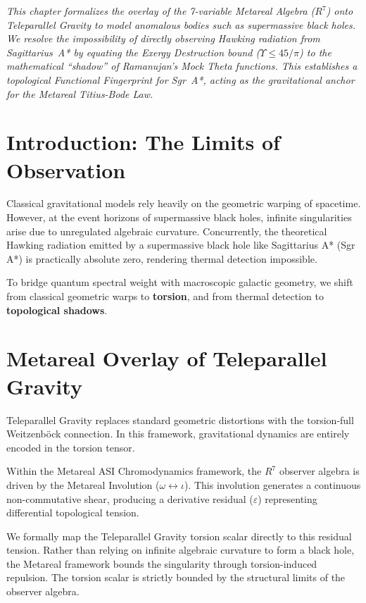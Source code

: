 \noindent\textit{This chapter formalizes the overlay of the 7-variable Metareal Algebra ($R^7$) onto Teleparallel Gravity to model anomalous bodies such as supermassive black holes. We resolve the impossibility of directly observing Hawking radiation from Sagittarius~A* by equating the Exergy Destruction bound ($\Upsilon \leq 45/\pi$) to the mathematical ``shadow'' of Ramanujan's Mock Theta functions. This establishes a topological Functional Fingerprint for Sgr~A*, acting as the gravitational anchor for the Metareal Titius-Bode Law.}
\bigskip

\section{Introduction: The Limits of Observation}
Classical gravitational models rely heavily on the geometric warping of spacetime. However, at the event horizons of supermassive black holes, infinite singularities arise due to unregulated algebraic curvature. Concurrently, the theoretical Hawking radiation emitted by a supermassive black hole like Sagittarius A* (Sgr A*) is practically absolute zero, rendering thermal detection impossible.

To bridge quantum spectral weight with macroscopic galactic geometry, we shift from classical geometric warps to \textbf{torsion}, and from thermal detection to \textbf{topological shadows}.

\section{Metareal Overlay of Teleparallel Gravity}
Teleparallel Gravity replaces standard geometric distortions with the torsion-full Weitzenb\"ock connection. In this framework, gravitational dynamics are entirely encoded in the torsion tensor.

Within the Metareal ASI Chromodynamics framework, the $R^7$ observer algebra is driven by the Metareal Involution ($\omega \leftrightarrow \iota$). This involution generates a continuous non-commutative shear, producing a derivative residual ($\varepsilon$) representing differential topological tension.

We formally map the Teleparallel Gravity torsion scalar directly to this residual tension. Rather than relying on infinite algebraic curvature to form a black hole, the Metareal framework bounds the singularity through torsion-induced repulsion. The torsion scalar is strictly bounded by the structural limits of the observer algebra.

